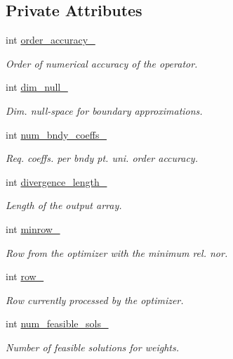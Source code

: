 \subsection*{Private Attributes}
\begin{DoxyCompactItemize}
\item 
int \hyperlink{classmtk_1_1Div1D_a9c8a8d7cd08a72dbd1daa8deee06f9c6}{order\+\_\+accuracy\+\_\+}
\begin{DoxyCompactList}\small\item\em Order of numerical accuracy of the operator. \end{DoxyCompactList}\item 
int \hyperlink{classmtk_1_1Div1D_a264027144def76d802778391f55381a0}{dim\+\_\+null\+\_\+}
\begin{DoxyCompactList}\small\item\em Dim. null-\/space for boundary approximations. \end{DoxyCompactList}\item 
int \hyperlink{classmtk_1_1Div1D_a717240b41eaa2adde858630b9e3d3042}{num\+\_\+bndy\+\_\+coeffs\+\_\+}
\begin{DoxyCompactList}\small\item\em Req. coeffs. per bndy pt. uni. order accuracy. \end{DoxyCompactList}\item 
int \hyperlink{classmtk_1_1Div1D_ac0f152190cd2fbff62deb07f96284f86}{divergence\+\_\+length\+\_\+}
\begin{DoxyCompactList}\small\item\em Length of the output array. \end{DoxyCompactList}\item 
int \hyperlink{classmtk_1_1Div1D_a0ba7a75cca6cf3646deb7a030cbbf3f3}{minrow\+\_\+}
\begin{DoxyCompactList}\small\item\em Row from the optimizer with the minimum rel. nor. \end{DoxyCompactList}\item 
int \hyperlink{classmtk_1_1Div1D_a86d99df0e9b1e5d2943a2dcf58975556}{row\+\_\+}
\begin{DoxyCompactList}\small\item\em Row currently processed by the optimizer. \end{DoxyCompactList}\item 
int \hyperlink{classmtk_1_1Div1D_aa5939920aee1ffccd2185822ca853b3d}{num\+\_\+feasible\+\_\+sols\+\_\+}
\begin{DoxyCompactList}\small\item\em Number of feasible solutions for weights. \end{DoxyCompactList}\item 

\end{DoxyCompactItemize}
